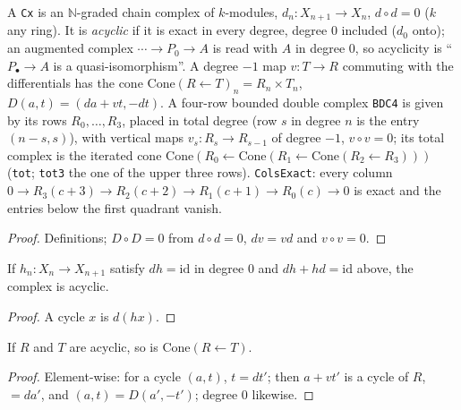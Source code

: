 \begin{definition}\label{def:mp-cx}
  \leanok
  A \texttt{Cx} is an $\mathbb N$-graded chain complex of $k$-modules, $d_n\colon X_{n+1}\to X_n$, $d\circ d=0$ ($k$ any ring).  It
  is \emph{acyclic} if it is exact in every degree, degree $0$ included ($d_0$ onto); an augmented complex
  $\cdots\to P_0\to A$ is read with $A$ in degree $0$, so acyclicity is ``$P_\bullet\to A$ is a quasi-isomorphism''.  A degree
  $-1$ map $v\colon T\to R$ commuting with the differentials has the cone $\mathrm{Cone}(R\leftarrow T)_n=R_n\times T_n$,
  $D(a,t)=(da+vt,-dt)$.  A four-row bounded double complex \texttt{BDC4} is given by its rows $R_0,\dots,R_3$, placed in total
  degree (row $s$ in degree $n$ is the entry $(n-s,s)$), with vertical maps $v_s\colon R_s\to R_{s-1}$ of degree $-1$, $v\circ v=0$;
  its total complex is the iterated cone $\mathrm{Cone}(R_0\leftarrow\mathrm{Cone}(R_1\leftarrow\mathrm{Cone}(R_2\leftarrow R_3)))$
  (\texttt{tot}; \texttt{tot3} the one of the upper three rows).  \texttt{ColsExact}: every column
  $0\to R_3(c+3)\to R_2(c+2)\to R_1(c+1)\to R_0(c)\to0$ is exact and the entries below the first quadrant vanish.
\end{definition}
\begin{proof}
  \leanok
  Definitions; $D\circ D=0$ from $d\circ d=0$, $dv=vd$ and $v\circ v=0$.
\end{proof}

\begin{lemma}\label{lem:mp-contract}
  \leanok
  If $h_n\colon X_n\to X_{n+1}$ satisfy $d h=\mathrm{id}$ in degree $0$ and $dh+hd=\mathrm{id}$ above, the complex is acyclic.
\end{lemma}
\begin{proof}
  \leanok
  A cycle $x$ is $d(hx)$.
\end{proof}

\begin{lemma}\label{lem:mp-cone-acyclic}
  \leanok
  If $R$ and $T$ are acyclic, so is $\mathrm{Cone}(R\leftarrow T)$.
\end{lemma}
\begin{proof}
  \leanok
  Element-wise: for a cycle $(a,t)$, $t=dt'$; then $a+vt'$ is a cycle of $R$, $=da'$, and $(a,t)=D(a',-t')$; degree $0$ likewise.
\end{proof}

